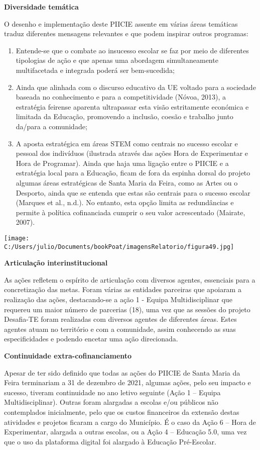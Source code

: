 \documentclass[
]{book}
\begin{document}
\textbf{Diversidade temática}

O desenho e implementação deste PIICIE assente em várias áreas temáticas traduz diferentes mensagens relevantes e que podem inspirar outros programas:

\begin{enumerate}
\def\labelenumi{\arabic{enumi}.}
\item
  Entende-se que o combate ao insucesso escolar se faz por meio de diferentes tipologias de ação e que apenas uma abordagem simultaneamente multifacetada e integrada poderá ser bem-sucedida;
\item
  Ainda que alinhada com o discurso educativo da UE voltado para a sociedade baseada no conhecimento e para a competitividade (Nóvoa, 2013), a estratégia feirense aparenta ultrapassar esta visão estritamente económica e limitada da Educação, promovendo a inclusão, coesão e trabalho junto da/para a comunidade;
\item
  A aposta estratégica em áreas STEM como centrais no sucesso escolar e pessoal dos indivíduos (ilustrada através das ações Hora de Experimentar e Hora de Programar).
  Ainda que haja uma ligação entre o PIICIE e a estratégia local para a Educação, ficam de fora da espinha dorsal do projeto algumas áreas estratégicas de Santa Maria da Feira, como as Artes ou o Desporto, ainda que se entenda que estas são centrais para o sucesso escolar (Marques et al., n.d.). No entanto, esta opção limita as redundâncias e permite à política cofinanciada cumprir o seu valor acrescentado (Mairate, 2007).
\end{enumerate}

\texttt{[image: C:/Users/julio/Documents/bookPoat/imagensRelatorio/figura49.jpg]}

\textbf{Articulação interinstitucional}

As ações refletem o espírito de articulação com diversos agentes, essenciais para a concretização das metas. Foram várias as entidades parceiras que apoiaram a realização das ações, destacando-se a ação 1 - Equipa Multidisciplinar que requereu um maior número de parcerias (18), uma vez que as sessões do projeto Desafia-TE foram realizadas com diversos agentes de diferentes áreas. Estes agentes atuam no território e com a comunidade, assim conhecendo as suas especificidades e podendo encetar uma ação direcionada.

\textbf{Continuidade extra-cofinanciamento}

Apesar de ter sido definido que todas as ações do PIICIE de Santa Maria da Feira terminariam a 31 de dezembro de 2021, algumas ações, pelo seu impacto e sucesso, tiveram continuidade no ano letivo seguinte (Ação 1 -- Equipa Multidisciplinar). Outras foram alargadas a escolas e/ou públicos não contemplados inicialmente, pelo que os custos financeiros da extensão destas atividades e projetos ficaram a cargo do Município. É o caso da Ação 6 -- Hora de Experimentar, alargada a outras escolas, ou a Ação 4 -- Educação 5.0, uma vez que o uso da plataforma digital foi alargado à Educação Pré-Escolar.
\end{document}

